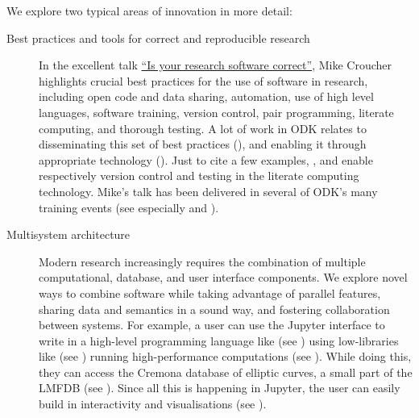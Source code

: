 \documentclass{deliverablereport}
\begin{document}
We explore two typical areas of innovation in more detail:
\begin{description}
\item[Best practices and tools for correct and reproducible research]
  In the excellent talk
  \href{https://mikecroucher.github.io/MLPM_talk/}{``Is your research
    software correct''}, Mike Croucher highlights crucial best
  practices for the use of software in research, including open code
  and data sharing, automation, use of high level languages, software
  training, version control, pair programming, literate computing, and thorough
  testing. A lot of work in ODK relates to disseminating this set of
  best practices (), and enabling it through
  appropriate technology ().  Just to cite a few
  examples, , and
   enable respectively version control
  and testing in the \Jupyter literate computing technology.
  Mike's talk has been delivered in several of ODK's many training events (see
  especially  and
  ).

\item[Multisystem architecture]
  Modern research increasingly requires the combination of multiple
  computational, database, and user interface components.
  We explore novel ways to combine software while taking
  advantage of parallel features, sharing data and
  semantics in a sound way, and fostering
  collaboration between systems.
  For example, a user can use the Jupyter interface to write
  in a high-level programming language like \Sage (see )
  using low-libraries like \Pari (see )
  running high-performance computations (see ).
  While doing this, they can access
  the Cremona database of elliptic curves, a small part of the LMFDB
  (see ).
  Since all this is happening in Jupyter, the user can easily build in
  interactivity and visualisations (see ).


\end{description}
\end{document}
